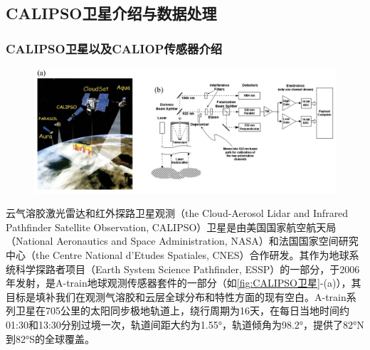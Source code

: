 \subsection{CALIPSO卫星介绍与数据处理}
\subsubsection{CALIPSO卫星以及CALIOP传感器介绍}
\begin{figure}[htbp]
    \centering
    \includegraphics[width=\linewidth]{figure/第二章用图/图2-CALIPSO.jpg}
\end{figure}

云气溶胶激光雷达和红外探路卫星观测（the Cloud-Aerosol Lidar and Infrared Pathfinder Satellite Observation, CALIPSO）卫星是由美国国家航空航天局（National Aeronautics and Space Administration, NASA）和法国国家空间研究中心（the Centre National d’Etudes Spatiales, CNES）合作研发\cite{winker2003accounting,CALIPSO_2009}。其作为地球系统科学探路者项目（Earth System Science Pathfinder, ESSP）的一部分，于2006年发射，是A-train地球观测传感器套件的一部分（如\autoref{fig:CALIPSO卫星}-(a)），其目标是填补我们在观测气溶胶和云层全球分布和特性方面的现有空白。\cite{CALIPSO_2009,winker2003accounting}A-train系列卫星在705公里的太阳同步极地轨道上，绕行周期为16天，在每日当地时间约01:30和13:30分别过境一次，轨道间距大约为1.55°，轨道倾角为98.2°，提供了82°N到82°S的全球覆盖。\cite{stephens2002cloudsat,CALIPSO_2009}

